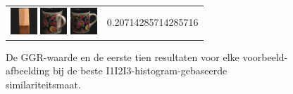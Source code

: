 \begin{figure}[tbp]
\begin{center}
\begin{tabular}{m{11cm} | m{3cm} |}
\includegraphics[width=1cm]{coil/beeld-44.eps}
\includegraphics[width=1cm]{coil/beeld-64.eps}
\includegraphics[width=1cm]{coil/beeld-60.eps}
& {\scriptsize 0.20714285714285716}
\end{tabular}
\caption{\label{fig:results_i1i2i3_histgeb}De GGR-waarde en de eerste tien resultaten voor elke voorbeeld-afbeelding bij de beste I1I2I3-histogram-gebaseerde similariteitsmaat.}
\end{center}
\end{figure}

